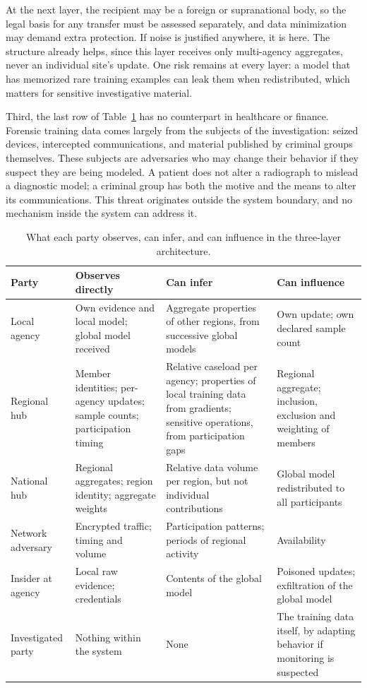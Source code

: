 At the next layer, the recipient may be a foreign or supranational body, so the legal basis for any transfer must be assessed separately, and data minimization may demand extra protection. If noise is justified anywhere, it is here. The structure already helps, since this layer receives only multi-agency aggregates, never an individual site's update. One risk remains at every layer: a model that has memorized rare training examples can leak them when redistributed, which matters for sensitive investigative material.


Third, the last row of Table~\ref{tab:threat_model} has no counterpart in healthcare or finance. Forensic training data comes largely from the subjects of the investigation: seized devices, intercepted communications, and material published by criminal groups themselves. These subjects are adversaries who may change their behavior if they suspect they are being modeled. A patient does not alter a radiograph to mislead a diagnostic model; a criminal group has both the motive and the means to alter its communications. This threat originates outside the system boundary, and no mechanism inside the system can address it.

\begin{table}[htpb]
\caption{What each party observes, can infer, and can influence in the three-layer architecture.}
\label{tab:threat_model}
\centering
\scriptsize
\begin{tabular}{@{}p{}p{}p{}p{}@{}}
\toprule
\textbf{Party} & \textbf{Observes directly} & \textbf{Can infer} & \textbf{Can influence} \\
\midrule
Local agency & Own evidence and local model; global model received & Aggregate properties of other regions, from successive global models & Own update; own declared sample count \\
\addlinespace
Regional hub & Member identities; per-agency updates; sample counts; participation timing & Relative caseload per agency; properties of local training data from gradients; sensitive operations, from participation gaps & Regional aggregate; inclusion, exclusion and weighting of members \\
\addlinespace
National hub & Regional aggregates; region identity; aggregate weights & Relative data volume per region, but not individual contributions & Global model redistributed to all participants \\
\addlinespace
Network adversary & Encrypted traffic; timing and volume & Participation patterns; periods of regional activity & Availability \\
\addlinespace
Insider at agency & Local raw evidence; credentials & Contents of the global model & Poisoned updates; exfiltration of the global model \\
\addlinespace
Investigated party & Nothing within the system & None & The training data itself, by adapting behavior if monitoring is suspected \\
\bottomrule
\end{tabular}
\end{table}


